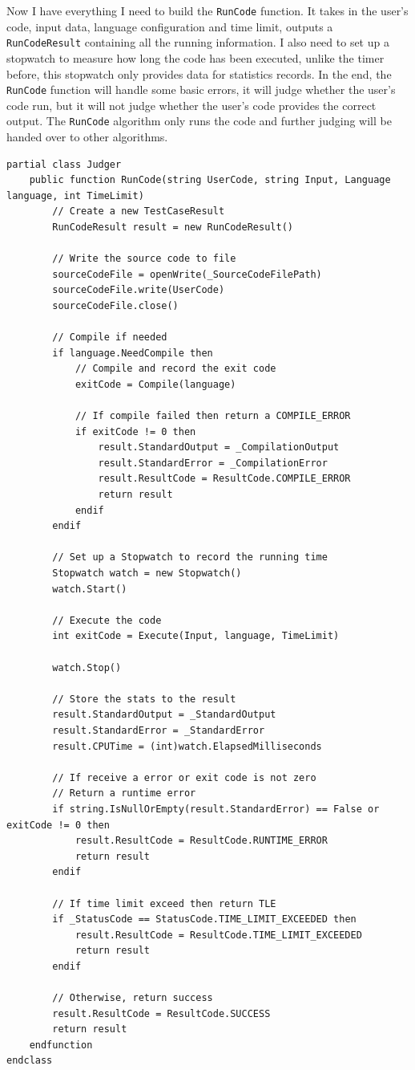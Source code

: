 \documentclass[a4paper]{report}
\begin{document}
Now I have everything I need to build the \texttt{RunCode} function. It takes in the user's code, input data, language configuration and time limit, outputs a \texttt{RunCodeResult} containing all the running information. I also need to set up a stopwatch to measure how long the code has been executed, unlike the timer before, this stopwatch only provides data for statistics records. In the end, the \texttt{RunCode} function will handle some basic errors, it will judge whether the user's code run, but it will not judge whether the user's code provides the correct output. The \texttt{RunCode} algorithm only runs the code and further judging will be handed over to other algorithms.

\begin{verbatim}
partial class Judger
    public function RunCode(string UserCode, string Input, Language language, int TimeLimit)
        // Create a new TestCaseResult
        RunCodeResult result = new RunCodeResult()

        // Write the source code to file
        sourceCodeFile = openWrite(_SourceCodeFilePath)
        sourceCodeFile.write(UserCode)
        sourceCodeFile.close()

        // Compile if needed
        if language.NeedCompile then
            // Compile and record the exit code
            exitCode = Compile(language)

            // If compile failed then return a COMPILE_ERROR
            if exitCode != 0 then
                result.StandardOutput = _CompilationOutput
                result.StandardError = _CompilationError
                result.ResultCode = ResultCode.COMPILE_ERROR
                return result
            endif
        endif

        // Set up a Stopwatch to record the running time
        Stopwatch watch = new Stopwatch()
        watch.Start()

        // Execute the code
        int exitCode = Execute(Input, language, TimeLimit)

        watch.Stop()

        // Store the stats to the result
        result.StandardOutput = _StandardOutput
        result.StandardError = _StandardError
        result.CPUTime = (int)watch.ElapsedMilliseconds

        // If receive a error or exit code is not zero
        // Return a runtime error
        if string.IsNullOrEmpty(result.StandardError) == False or exitCode != 0 then
            result.ResultCode = ResultCode.RUNTIME_ERROR
            return result
        endif

        // If time limit exceed then return TLE
        if _StatusCode == StatusCode.TIME_LIMIT_EXCEEDED then
            result.ResultCode = ResultCode.TIME_LIMIT_EXCEEDED
            return result
        endif

        // Otherwise, return success
        result.ResultCode = ResultCode.SUCCESS
        return result
    endfunction
endclass
\end{verbatim}
\end{document}
